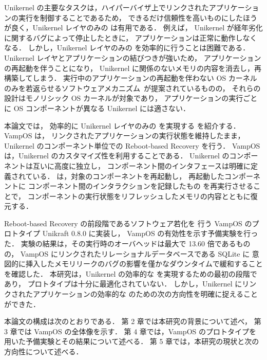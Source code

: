 Unikernel の主要なタスクは，ハイパーバイザ上でリンクされたアプリケーションの実行を制御することであるため，
できるだけ信頼性を高いものにしたほうが良く，Unikernel レイヤのみの
\rr は有用である．
例えば，
Unikernel が経年劣化に関するバグによって停止したときに，
アプリケーションは正常に動作しなくなる．
しかし，Unikernel レイヤのみの \rr を効率的に行うことは困難である．
Unikernel レイヤとアプリケーションの結びつきが強いため，
アプリケーションの再起動を伴うことになり，
Unikernel に関係のないメモリの内容を消去し，再構築してしまう．
実行中のアプリケーションの再起動を伴わない OS カーネルのみを若返らせるソフトウェアメカニズム~\cite{DepoutovitchEtAl-otherworld,TeradaEtAl-Dwarf}が提案されているものの，
それらの設計はモノリシック OS カーネルが対象であり，
アプリケーションの実行ごとに OS コンポーネントが異なる Unikernel には適さない．

本論文では，
効率的に Unikernel レイヤのみの \rr を実現する \emph{\sysname} を紹介する．
VampOS は，
リンクされたアプリケーションの実行状態を維持したまま，
Unikernel のコンポーネント単位での Reboot-based Recovery を行う．
VampOS は，Unikernel のカスタマイズ性を利用することである．
Unikernel のコンポーネントは互いに高度に独立し，
コンポーネント間のインタフェースは明確に定義されている．
\sysname は，対象のコンポーネントを再起動し，
再起動したコンポーネントに
コンポーネント間のインタラクションを記録したもの
を再実行させることで，
コンポーネントの実行状態をリフレッシュしたメモリの内容とともに復元する．

Reboot-based Recovery の前段階であるソフトウェア若化を
行う VampOS のプロトタイプ Unikraft 0.8.0 に実装し，
VampOS の有効性を示す予備実験を行った．
実験の結果は，その実行時のオーバヘッドは最大で 13.60 倍であるものの，
VampOS にリンクされたリレーショナルデータベースである SQLite に
意図的に挿入したメモリリークのバグの影響を僅かなダウンタイムで緩和することを確認した．
本研究は，Unikernel の効率的な \rr を実現するための最初の段階であり，
プロトタイプは十分に最適化されていない．
しかし，Unikernel にリンクされたアプリケーションの効率的な \rr のための次の方向性を明確に捉えることができた．

本論文の構成は次のとおりである．
第 2 章では本研究の背景について述べ，
第 3 章では VampOS の全体像を示す．
第 4 章では，VampOS のプロトタイプを用いた予備実験とその結果について述べる．
第 5 章では，本研究の現状と次の方向性について述べる．


